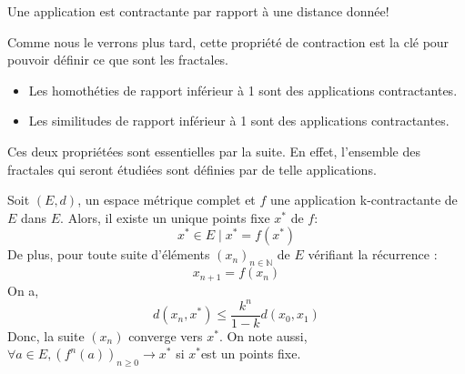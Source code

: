 \documentclass[a4paper, 12pt]{report}
\begin{document}
			\begin{remark*}
				Une application est contractante  par rapport à une distance donnée!
			\end{remark*}

			Comme nous le verrons plus tard, cette propriété de contraction est la clé pour pouvoir définir ce que sont les fractales. 
			\begin{prop}
				\begin{itemize}
					\item Les homothéties de rapport inférieur à 1 sont des applications contractantes.
					\item Les similitudes de rapport inférieur à 1 sont des applications contractantes.
				\end{itemize}
			\end{prop}
			Ces deux propriétées sont essentielles par la suite. En effet, l'ensemble des fractales qui seront étudiées sont définies par de telle applications.
			
			\begin{theorem}
				\label{ThmPtFixe}
				Soit $(E,d)$, un espace métrique complet et $f$ une application k-contractante de $E$ dans $E$. Alors, il existe un unique points fixe $x^*$ de $f$:
				\begin{equation*}
					x^*\in E\mid x^*=f(x^*)
				\end{equation*}
				De plus, pour toute suite d'éléments $(x_n)_{n\in\mathds{N}}$ de $E$ vérifiant la récurrence :
				\begin{equation*}
					x_{n+1}=f(x_n)
				\end{equation*}
				On a,
				\begin{equation}
					d(x_n,x^*)\leq \frac{k^n}{1-k} d(x_0,x_1)
				\end{equation}
				Donc, la suite $(x_n)$ converge vers $x^*$.
				On note aussi, $\forall a\in E,(f^n(a))_{n\geq 0}\longrightarrow x^*$ si $x^*$est un points fixe.
			\end{theorem}
			
\end{document}
